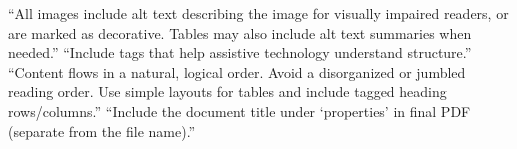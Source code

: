 	{``All images include alt text describing the image for visually impaired
	 readers, or are marked as decorative. Tables may also include alt text
	 summaries when needed.''}
	{``Include tags that help assistive technology understand structure.''}
	{``Content flows in a natural, logical order. Avoid a disorganized or
	 jumbled reading order. Use simple layouts for tables and include tagged
	 heading rows/columns.''}
	{``Include the document title under `properties' in final PDF (separate from
	 the file name).''}

\newcommand{\asu@approved}{}
\newcommand{\asuapproved}[1]{\renewcommand{\asu@approved}{#1}}

